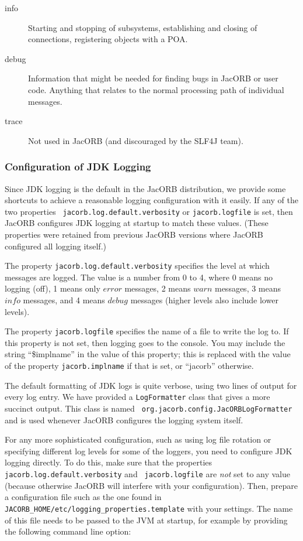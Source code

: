 {{\begin{description}
\item[info] Starting and stopping of subsystems, establishing and
  closing of connections, registering objects with a POA.

\item[debug] Information that might be needed for finding bugs in
  JacORB or user code.  Anything that relates to the normal processing
  path of individual messages.

\item[trace] Not used in JacORB (and discouraged by the SLF4J team).
\end{description}

\subsubsection{Configuration of JDK Logging}

Since JDK logging is the default in the JacORB distribution, we
provide some shortcuts to achieve a reasonable logging configuration
with it easily.  If any of the two properties {\tt
  jacorb.log.default.verbosity} or {\tt jacorb.logfile} is set, then
JacORB configures JDK logging at startup to match these values.
(These properties were retained from previous JacORB versions where
JacORB configured all logging itself.)

The property {\tt jacorb.log.default.verbosity} specifies the level at
which messages are logged.  The value is a number from 0 to 4, where 0
means no logging (off), 1 means only $error$ messages, 2 means $warn$
messages, 3 means $info$ messages, and 4 means $debug$ messages (higher
levels also include lower levels).

The property {\tt jacorb.logfile} specifies the name of a file to
write the log to.  If this property is not set, then logging goes to
the console.  You may include the string ``\$implname'' in the value
of this property; this is replaced with the value of the property
{\tt jacorb.implname} if that is set, or ``jacorb'' otherwise.

The default formatting of JDK logs is quite verbose, using two lines
of output for every log entry.  We have provided a {\tt LogFormatter}
class that gives a more succinct output.  This class is named {\tt
  org.jacorb.config.JacORBLogFormatter} and is used whenever JacORB
configures the logging system itself.

For any more sophisticated configuration, such as using log file
rotation or specifying different log levels for some of the loggers,
you need to configure JDK logging directly.  To do this, make sure
that the properties {\tt jacorb.log.default.verbosity} and {\tt
  jacorb.logfile} are \emph{not} set to any value (because otherwise
JacORB will interfere with your configuration).  Then, prepare a
configuration file such as the one found in {\tt
  JACORB\_HOME/etc/logging\_properties.template} with your settings.
The name of this file needs to be passed to the JVM at startup, for
example by providing the following command line option:

}}

